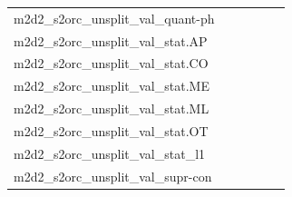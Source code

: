 \documentclass[dvipsnames]{article}
\begin{document}
\begin{appendix}
{\begin{longtable}{m{6cm}m{1.7cm}m{1.7cm}m{1.7cm}m{1.7cm}m{1.7cm}}
	m2d2\_s2orc\_unsplit\_val\_quant-ph  & \colorbox[HTML]{98d485}{\makebox[\mywidth][c]{11.18}} & \colorbox[HTML]{e2f3a9}{\makebox[\mywidth][c]{11.44}} & \colorbox[HTML]{ffffe5}{\makebox[\mywidth][c]{13.18}} & \colorbox[HTML]{cae99c}{\makebox[\mywidth][c]{11.32}} & \colorbox[HTML]{77c578}{\makebox[\mywidth][c]{11.11}}\\
	m2d2\_s2orc\_unsplit\_val\_stat.AP  & \colorbox[HTML]{c5e799}{\makebox[\mywidth][c]{13.37}} & \colorbox[HTML]{e6f5ad}{\makebox[\mywidth][c]{13.56}} & \colorbox[HTML]{ffffe5}{\makebox[\mywidth][c]{15.52}} & \colorbox[HTML]{d1ec9f}{\makebox[\mywidth][c]{13.42}} & \colorbox[HTML]{77c578}{\makebox[\mywidth][c]{13.15}}\\
	m2d2\_s2orc\_unsplit\_val\_stat.CO  & \colorbox[HTML]{fcfdd5}{\makebox[\mywidth][c]{13.07}} & \colorbox[HTML]{def2a6}{\makebox[\mywidth][c]{12.56}} & \colorbox[HTML]{ffffe5}{\makebox[\mywidth][c]{14.42}} & \colorbox[HTML]{c9e99b}{\makebox[\mywidth][c]{12.46}} & \colorbox[HTML]{77c578}{\makebox[\mywidth][c]{12.24}}\\
	m2d2\_s2orc\_unsplit\_val\_stat.ME  & \colorbox[HTML]{ceeb9e}{\makebox[\mywidth][c]{11.09}} & \colorbox[HTML]{ebf7b0}{\makebox[\mywidth][c]{11.26}} & \colorbox[HTML]{ffffe5}{\makebox[\mywidth][c]{12.91}} & \colorbox[HTML]{d3eda0}{\makebox[\mywidth][c]{11.11}} & \colorbox[HTML]{77c578}{\makebox[\mywidth][c]{10.87}}\\
	m2d2\_s2orc\_unsplit\_val\_stat.ML  & \colorbox[HTML]{95d284}{\makebox[\mywidth][c]{11.13}} & \colorbox[HTML]{def2a6}{\makebox[\mywidth][c]{11.39}} & \colorbox[HTML]{ffffe5}{\makebox[\mywidth][c]{13.29}} & \colorbox[HTML]{bae294}{\makebox[\mywidth][c]{11.23}} & \colorbox[HTML]{77c578}{\makebox[\mywidth][c]{11.06}}\\
	m2d2\_s2orc\_unsplit\_val\_stat.OT  & \colorbox[HTML]{9bd587}{\makebox[\mywidth][c]{11.31}} & \colorbox[HTML]{e1f3a9}{\makebox[\mywidth][c]{11.55}} & \colorbox[HTML]{ffffe5}{\makebox[\mywidth][c]{13.28}} & \colorbox[HTML]{cae99c}{\makebox[\mywidth][c]{11.45}} & \colorbox[HTML]{77c578}{\makebox[\mywidth][c]{11.24}}\\
	m2d2\_s2orc\_unsplit\_val\_stat\_l1  & \colorbox[HTML]{fcfdd5}{\makebox[\mywidth][c]{13.07}} & \colorbox[HTML]{def2a6}{\makebox[\mywidth][c]{12.56}} & \colorbox[HTML]{ffffe5}{\makebox[\mywidth][c]{14.42}} & \colorbox[HTML]{c9e99b}{\makebox[\mywidth][c]{12.46}} & \colorbox[HTML]{77c578}{\makebox[\mywidth][c]{12.24}}\\
	m2d2\_s2orc\_unsplit\_val\_supr-con  & \colorbox[HTML]{dff2a7}{\makebox[\mywidth][c]{11.57}} & \colorbox[HTML]{edf8b2}{\makebox[\mywidth][c]{11.66}} & \colorbox[HTML]{ffffe5}{\makebox[\mywidth][c]{13.13}} & \colorbox[HTML]{d8efa2}{\makebox[\mywidth][c]{11.53}} & \colorbox[HTML]{77c578}{\makebox[\mywidth][c]{11.30}}\\

\end{longtable}}
\end{appendix}
\end{document}
